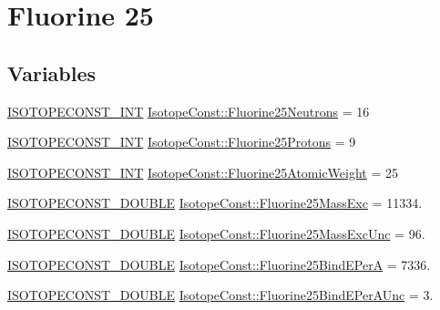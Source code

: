 \hypertarget{group___isotope_const-_fluorine-_f25}{}\section{Fluorine 25}
\label{group___isotope_const-_fluorine-_f25}
\subsection*{Variables}
\begin{DoxyCompactItemize}
\item 
\mbox{\hyperlink{group___isotope_const-_macros_ga5f18360b3e99483a35c32d789e62621c}{I\+S\+O\+T\+O\+P\+E\+C\+O\+N\+S\+T\+\_\+\+I\+NT}} \mbox{\hyperlink{group___isotope_const-_fluorine-_f25_ga41d3e9793693d29a8541f026261ee454}{Isotope\+Const\+::\+Fluorine25\+Neutrons}} = 16
\item 
\mbox{\hyperlink{group___isotope_const-_macros_ga5f18360b3e99483a35c32d789e62621c}{I\+S\+O\+T\+O\+P\+E\+C\+O\+N\+S\+T\+\_\+\+I\+NT}} \mbox{\hyperlink{group___isotope_const-_fluorine-_f25_gaa362d9a414d6772951c10a06b19c8191}{Isotope\+Const\+::\+Fluorine25\+Protons}} = 9
\item 
\mbox{\hyperlink{group___isotope_const-_macros_ga5f18360b3e99483a35c32d789e62621c}{I\+S\+O\+T\+O\+P\+E\+C\+O\+N\+S\+T\+\_\+\+I\+NT}} \mbox{\hyperlink{group___isotope_const-_fluorine-_f25_ga1a8ed7f69072a969fb33f5abf00df071}{Isotope\+Const\+::\+Fluorine25\+Atomic\+Weight}} = 25
\item 
\mbox{\hyperlink{group___isotope_const-_macros_ga8f45a7272ce02c0b4c65c44636ed719a}{I\+S\+O\+T\+O\+P\+E\+C\+O\+N\+S\+T\+\_\+\+D\+O\+U\+B\+LE}} \mbox{\hyperlink{group___isotope_const-_fluorine-_f25_gaa97dfecbcbab6a32f53f58ea5f2cb4ca}{Isotope\+Const\+::\+Fluorine25\+Mass\+Exc}} = 11334.
\item 
\mbox{\hyperlink{group___isotope_const-_macros_ga8f45a7272ce02c0b4c65c44636ed719a}{I\+S\+O\+T\+O\+P\+E\+C\+O\+N\+S\+T\+\_\+\+D\+O\+U\+B\+LE}} \mbox{\hyperlink{group___isotope_const-_fluorine-_f25_gaf3cfc07e805c02d8fa5a39b6c481d2ce}{Isotope\+Const\+::\+Fluorine25\+Mass\+Exc\+Unc}} = 96.
\item 
\mbox{\hyperlink{group___isotope_const-_macros_ga8f45a7272ce02c0b4c65c44636ed719a}{I\+S\+O\+T\+O\+P\+E\+C\+O\+N\+S\+T\+\_\+\+D\+O\+U\+B\+LE}} \mbox{\hyperlink{group___isotope_const-_fluorine-_f25_ga9e0e9d0c0af73148072e5ddc10d3d798}{Isotope\+Const\+::\+Fluorine25\+Bind\+E\+PerA}} = 7336.
\item 
\mbox{\hyperlink{group___isotope_const-_macros_ga8f45a7272ce02c0b4c65c44636ed719a}{I\+S\+O\+T\+O\+P\+E\+C\+O\+N\+S\+T\+\_\+\+D\+O\+U\+B\+LE}} \mbox{\hyperlink{group___isotope_const-_fluorine-_f25_gaec76d3031def6f713a525c73f1d3dd8a}{Isotope\+Const\+::\+Fluorine25\+Bind\+E\+Per\+A\+Unc}} = 3.

\end{DoxyCompactItemize}
